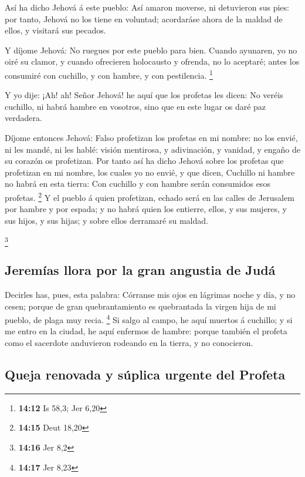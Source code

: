  Así ha dicho Jehová á este pueblo: Así amaron moverse, ni
detuvieron sus pies: por tanto, Jehová no los tiene en voluntad;
acordaráse ahora de la maldad de ellos, y visitará sus pecados.

 Y díjome Jehová: No ruegues por este pueblo para bien.
 Cuando ayunaren, yo no oiré su clamor, y cuando ofrecieren
holocausto y ofrenda, no lo aceptaré; antes los consumiré con cuchillo,
y con hambre, y con pestilencia. \footnote{\textbf{14:12} Is 58,3; Jer
  6,20}

 Y yo dije: ¡Ah! ah! Señor Jehová! he aquí que los profetas
les dicen: No veréis cuchillo, ni habrá hambre en vosotros, sino que en
este lugar os daré paz verdadera.

 Díjome entonces Jehová: Falso profetizan los profetas en
mi nombre: no los envié, ni les mandé, ni les hablé: visión mentirosa, y
adivinación, y vanidad, y engaño de su corazón os profetizan.
 Por tanto así ha dicho Jehová sobre los profetas que
profetizan en mi nombre, los cuales yo no envié, y que dicen, Cuchillo
ni hambre no habrá en esta tierra: Con cuchillo y con hambre serán
consumidos esos profetas. \footnote{\textbf{14:15} Deut 18,20}
 Y el pueblo á quien profetizan, echado será en las calles
de Jerusalem por hambre y por espada; y no habrá quien los entierre,
ellos, y sus mujeres, y sus hijos, y sus hijas; y sobre ellos derramaré
su maldad.

\footnote{\textbf{14:16} Jer 8,2}

\hypertarget{jeremuxedas-llora-por-la-gran-angustia-de-juduxe1}{%
\subsection{Jeremías llora por la gran angustia de
Judá}\label{jeremuxedas-llora-por-la-gran-angustia-de-juduxe1}}

 Decirles has, pues, esta palabra: Córranse mis ojos en
lágrimas noche y día, y no cesen; porque de gran quebrantamiento es
quebrantada la virgen hija de mi pueblo, de plaga muy recia. \footnote{\textbf{14:17}
  Jer 8,23}  Si salgo al campo, he aquí muertos á cuchillo;
y si me entro en la ciudad, he aquí enfermos de hambre: porque también
el profeta como el sacerdote anduvieron rodeando en la tierra, y no
conocieron.

\hypertarget{queja-renovada-y-suxfaplica-urgente-del-profeta}{%
\subsection{Queja renovada y súplica urgente del
Profeta}\label{queja-renovada-y-suxfaplica-urgente-del-profeta}}

